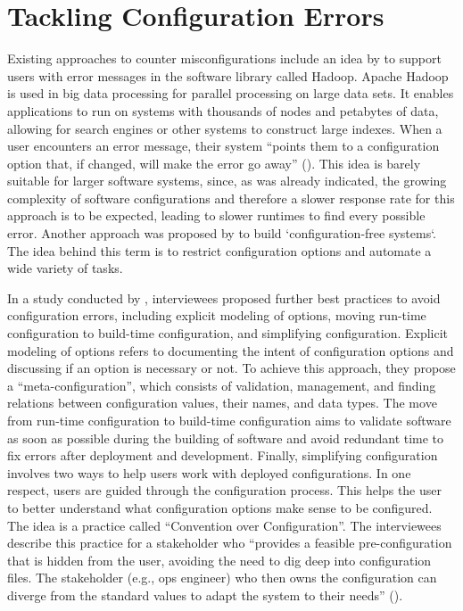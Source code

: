 \documentclass[english,bachelor]{swsLeipzig}
\begin{document}
\section{Tackling Configuration Errors}\label{tackling_configuration_errors}
Existing approaches to counter misconfigurations include an idea by \citet{rabkin:2011} to support users with error
 messages in the software library called Hadoop. Apache Hadoop is used in big data processing for parallel processing on large data sets. It enables applications to run on systems with thousands of nodes and petabytes of data, allowing for search engines or other systems to construct large indexes. When a user encounters an error message, their system ``points them to a configuration option that, if changed, will make the error go away'' (\citet{rabkin:2011}). This idea is barely suitable for larger software systems, since, as was already indicated, the growing complexity of software configurations and therefore a slower response rate for this approach is to be expected, leading to slower runtimes to find every possible error. Another approach was proposed by \citet{yinma:2011} to build `configuration-free systems`. The idea behind this term is to restrict configuration options and automate a wide variety of tasks.

In a study conducted by \citet{siegmund:2020}, interviewees proposed further best practices to avoid configuration 
errors, including explicit modeling of options, moving run-time configuration to build-time configuration, and simplifying configuration. Explicit modeling of options refers to documenting the intent of configuration options and discussing if an option is necessary or not. To achieve this approach, they propose a ``meta-configuration'', which consists of validation, management, and finding relations between configuration values, their names, and data types. The move from run-time configuration to build-time configuration aims to validate software as soon as possible during the building of software and avoid redundant time to fix errors after deployment and development. Finally, simplifying configuration involves two ways to help users work with deployed configurations. In one respect, users are guided through the configuration process. This helps the user to better understand what configuration options make sense to be configured. The idea is a practice called ``Convention over Configuration''. The interviewees describe this practice for a stakeholder who ``provides a feasible pre-configuration that is hidden from the user, avoiding the need to dig deep into configuration files. The stakeholder (e.g., ops engineer) who then owns the configuration can diverge from the standard values to adapt the system to their needs'' (\citet{siegmund:2020}).
\end{document}
